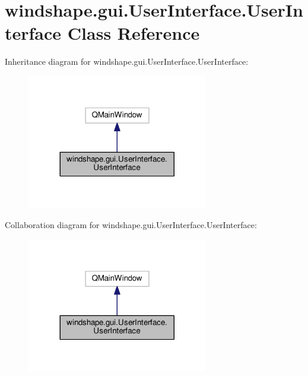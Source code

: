 \hypertarget{classwindshape_1_1gui_1_1_user_interface_1_1_user_interface}{}\section{windshape.\+gui.\+User\+Interface.\+User\+Interface Class Reference}
\label{classwindshape_1_1gui_1_1_user_interface_1_1_user_interface}


Inheritance diagram for windshape.\+gui.\+User\+Interface.\+User\+Interface\+:\nopagebreak
\begin{figure}[H]
\begin{center}
\leavevmode
\includegraphics[width=224pt]{classwindshape_1_1gui_1_1_user_interface_1_1_user_interface__inherit__graph}
\end{center}
\end{figure}


Collaboration diagram for windshape.\+gui.\+User\+Interface.\+User\+Interface\+:\nopagebreak
\begin{figure}[H]
\begin{center}
\leavevmode
\includegraphics[width=224pt]{classwindshape_1_1gui_1_1_user_interface_1_1_user_interface__coll__graph}
\end{center}
\end{figure}
